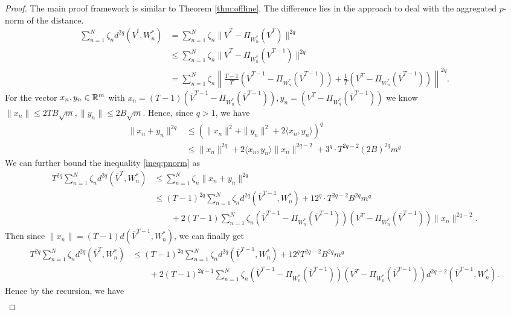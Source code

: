\begin{proof}
The main proof framework is similar to Theorem \ref{thm:offline}. The difference lies in the approach to deal with the aggregated $p$-norm of the distance. 
\begin{align}
    \sum_{n=1}^N \zeta_nd^{2q}(\overline{V}^t, W_n^*) & = \sum_{n=1}^N\zeta_n \|\overline{V}^T - \Pi_{W_n^*}(\overline{V}^T)\|^{2q}\\
    & \le \sum_{n=1}^N \zeta_n\|\overline{V}^T - \Pi_{W_n^*}(\overline{V}^{T-1})\|^{2q}\\
    & = \sum_{n=1}^N \zeta_n\left\|\frac{T-1}{T}(\overline{V}^{T-1}-\Pi_{W_n^*}(\overline{V}^{T-1})) + \frac{1}{T}(V^T - \Pi_{W_n^*}(\overline{V}^{T-1}))\right\|^{2q}. \label{ineq:pnorm}
\end{align}
For the vector $x_n,y_n \in \mathbb{R}^m$ with $x_n=(T-1)(\overline{V}^{T-1}-\Pi_{W_n^*}(\overline{V}^{T-1})), y_n= (V^T-\Pi_{W_n^*}(\overline{V}^{T-1}))$  we know $\|x_n\| \le 2TB\sqrt{m}, \|y_n\| \le 2B\sqrt{m}$. Hence, since $q>1$, we have
\begin{align*}\|x_n+y_n\|^{2q} &\le (\|x_n\|^2 + \|y_n\|^2 + 2\langle x_n,y_n\rangle)^{q}\\&\le \|x_n\|^{2q} + 2\langle x_n,y_n\rangle \|x_n\|^{2q-2} + 3^q\cdot T^{2q-2}(2B)^{2q}m^q\end{align*}
 We can further bound the inequality \eqref{ineq:pnorm} as 
\begin{align}
    T^{2q} \sum_{n=1}^N \zeta_n d^{2q}(\overline{V}^{T}, W_n^*) &\le  \sum_{n=1}^N \zeta_n\|x_n+y_n\|^{2q} \\&\le (T-1)^{2q}\sum_{n=1}^N \zeta_nd^{2q}(\overline{V}^{T-1}, W_n^*) + 12^q\cdot T^{2q-2}B^{2q}m^q\\
    &\qquad  + 2 (T-1)\sum_{n=1}^N \zeta_n(\overline{V}^{T-1}-\Pi_{W_n^*}(\overline{V}^{T-1}))(V^T-\Pi_{W_n^*}(\overline{V}^{T-1}))\|x_n\|^{2q-2}.
\end{align}
Then since $\|x_n\| = (T-1) d(\overline{V}^{T-1}, W_n^*)$, we can finally get 
\begin{align}
T^{2q} \sum_{n=1}^N \zeta_nd^{2q}(\overline{V}^{T}, W_n^*) &\le (T-1)^{2q} \sum_{n=1}^N \zeta_nd^{2q}(\overline{V}^{T-1}, W_n^*) + 12^qT^{2q-2}B^{2q}m^q\\
&\qquad + 2(T-1)^{2q-1}\sum_{n=1}^N \zeta_n(\overline{V}^{T-1}-\Pi_{W_n^*}(\overline{V}^{T-1}))(V^T-\Pi_{W_n^*}(\overline{V}^{T-1}))d^{2q-2}(\overline{V}^{T-1}, W_n^*).\label{eq:recursion before}
\end{align}
Hence by the recursion, we have 
\begin{align}

\end{align}
\end{proof}
